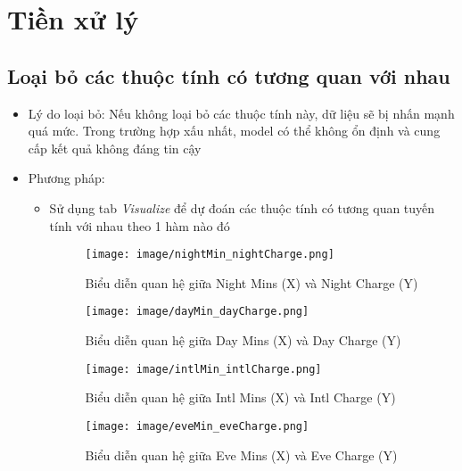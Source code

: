 \documentclass[a4paper, 12pt]{article}
\begin{document}
\section{Tiền xử lý}

\subsection{Loại bỏ các thuộc tính có tương quan với nhau}

\begin{itemize}
    \item Lý do loại bỏ: Nếu không loại bỏ các thuộc tính này, dữ liệu sẽ bị nhấn mạnh quá mức. Trong trường hợp xấu nhất, model có thể không ổn định và cung cấp kết quả không đáng tin cậy
    \item Phương pháp: 
    \begin{itemize}
        \item Sử dụng tab \textit{Visualize} để dự đoán các thuộc tính có tương quan tuyến tính với nhau theo 1 hàm nào đó
        \begin{figure}[H]
            \begin{center}
                \texttt{[image: image/nightMin\_nightCharge.png]}
                \caption{Biểu diễn quan hệ giữa Night Mins (X) và Night Charge (Y)}
            \end{center}
        \end{figure}

        \begin{figure}[H]
            \begin{center}
                \texttt{[image: image/dayMin\_dayCharge.png]}
                \caption{Biểu diễn quan hệ giữa Day Mins (X) và Day Charge (Y)}

                \texttt{[image: image/intlMin\_intlCharge.png]}
                \caption{Biểu diễn quan hệ giữa Intl Mins (X) và Intl Charge (Y)}
            \end{center}
        \end{figure}

        \begin{figure}[H]
            \begin{center}
                \texttt{[image: image/eveMin\_eveCharge.png]}
                \caption{Biểu diễn quan hệ giữa Eve Mins (X) và Eve Charge (Y)}
            \end{center}
        \end{figure}


\end{itemize}
\end{itemize}
\end{document}
